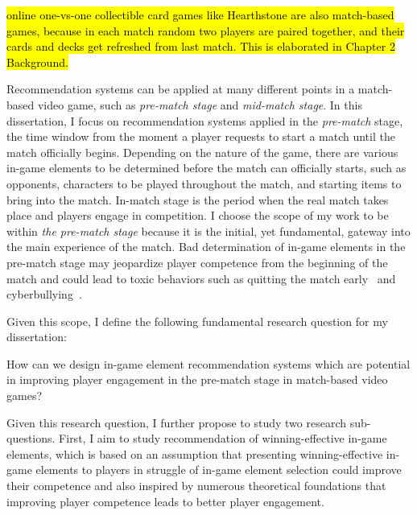 \hl{online one-vs-one collectible card games like Hearthstone are also match-based games, because in each match random two players are paired together, and their cards and decks get refreshed from last match. This is elaborated in Chapter 2 Background.}

Recommendation systems can be applied at many different points in a match-based video game, such as \textit{pre-match stage} and \textit{mid-match stage}. In this dissertation, I focus on recommendation systems applied in the \textit{pre-match} stage, the time window from the moment a player requests to start a match until the match officially begins. Depending on the nature of the game, there are various in-game elements to be determined before the match can officially starts, such as opponents, characters to be played throughout the match, and starting items to bring into the match. In-match stage is the period when the real match takes place and players engage in competition. I choose the scope of my work to be within \textit{the pre-match stage} because it is the initial, yet fundamental, gateway into the main experience of the match. Bad determination of in-game elements in the pre-match stage may jeopardize player competence from the beginning of the match and could lead to toxic behaviors such as quitting the match early~\cite{shores2014identification} and cyberbullying~\cite{kwak2015exploring}. 

Given this scope, I define the following fundamental research question for my dissertation:

\begin{displayquote}
How can we design in-game element recommendation systems which  are potential in improving player engagement in the pre-match stage in match-based video games?
\end{displayquote}


Given this research question, I further propose to study two research sub-questions. First, I aim to study recommendation of winning-effective in-game elements, which is based on an assumption that presenting winning-effective in-game elements to players in struggle of in-game element selection could improve their competence and also inspired by numerous theoretical foundations that improving player competence leads to better player engagement. 

